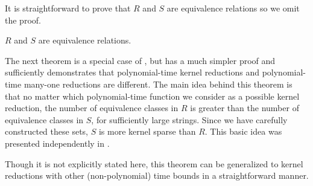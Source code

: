 It is straightforward to prove that $R$ and $S$ are equivalence relations so we omit the proof.

\begin{lemma}
  $R$ and $S$ are equivalence relations.
\end{lemma}

The next theorem is a special case of \autocite[Theorem~5.1]{bcffm}, but has a much simpler proof and sufficiently demonstrates that polynomial-time kernel reductions and polynomial-time many-one reductions are different.
The main idea behind this theorem is that no matter which polynomial-time function we consider as a possible kernel reduction, the number of equivalence classes in $R$ is greater than the number of equivalence classes in $S$, for sufficiently large strings.
Since we have carefully constructed these sets, $S$ is more kernel sparse than $R$.
This basic idea was presented independently in \autocite[Lemma~2.3]{gz14}.

Though it is not explicitly stated here, this theorem can be generalized to kernel reductions with other (non-polynomial) time bounds in a straightforward manner.

